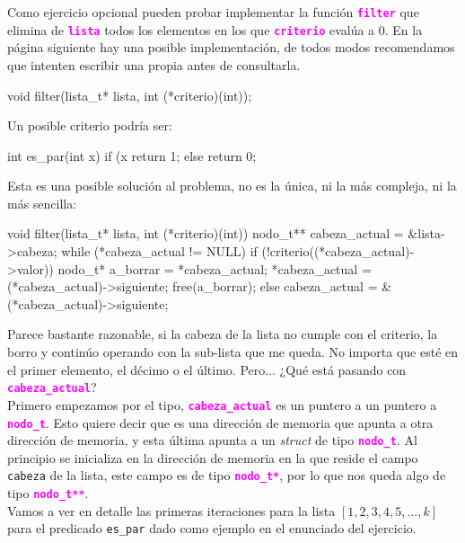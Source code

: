 \documentclass[]{scrartcl}
\newcommand{\hl}[1]{\textcolor{magenta}{\textbf{\texttt{#1}}}}
\begin{document}
Como ejercicio opcional pueden probar implementar la función \hl{filter} que elimina de \hl{lista} todos los elementos en los que \hl{criterio} evalúa a 0. En la página siguiente hay una posible implementación, de todos modos recomendamos que intenten escribir una propia antes de consultarla.
\begin{bashbox}[minted language=C]
void filter(lista_t* lista, int (*criterio)(int));
\end{bashbox}

Un posible criterio podría ser:
\begin{cbox}[unbreakable]{}
int es_par(int x) {
    if (x %
        return 1;
    else
        return 0;
}
\end{cbox}

\newpage

Esta es una posible solución al problema, no es la única, ni la más compleja, ni la más sencilla:

\begin{cbox}[unbreakable]{}
void filter(lista_t* lista, int (*criterio)(int)) {
    nodo_t** cabeza_actual = &lista->cabeza;
    while (*cabeza_actual != NULL) {
        if (!criterio((*cabeza_actual)->valor)) {
            nodo_t* a_borrar = *cabeza_actual;
            *cabeza_actual = (*cabeza_actual)->siguiente;
            free(a_borrar);
        } else {
            cabeza_actual = &(*cabeza_actual)->siguiente;
        }
    }
}
\end{cbox}

Parece bastante razonable, si la cabeza de la lista no cumple con el criterio, la borro y continúo operando con la sub-lista que me queda. No importa que esté en el primer elemento, el décimo o el último. Pero... ¿Qué está pasando con \hl{cabeza\_actual}? \\

Primero empezamos por el tipo, \hl{cabeza\_actual} es un puntero a un puntero a \hl{nodo\_t}. Esto quiere decir que es una dirección de memoria que apunta a otra dirección de memoria, y esta última apunta a un \textit{struct} de tipo \hl{nodo\_t}. Al principio se inicializa en la dirección de memoria en la que reside el campo \texttt{cabeza} de la lista, este campo es de tipo \hl{nodo\_t*}, por lo que nos queda algo de tipo \hl{nodo\_t**}. \\

Vamos a ver en detalle las primeras iteraciones para la lista $[1,2,3,4,5,..., k]$ para el predicado \texttt{es\_par} dado como ejemplo en el enunciado del ejercicio. \\
\end{document}
